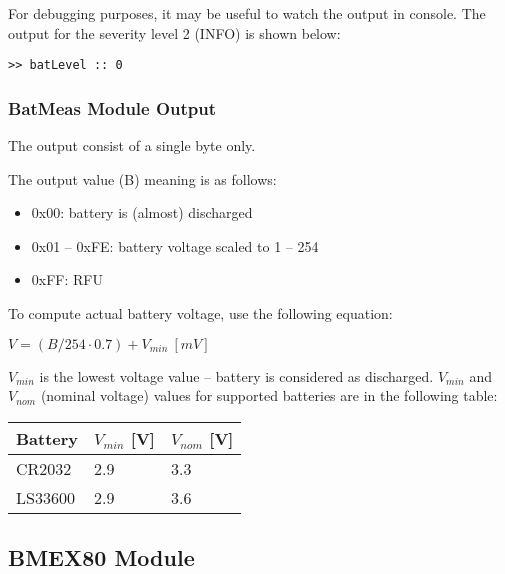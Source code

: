 For debugging purposes, it may be useful to watch the  output in console. The output for the severity level 2 (INFO) is shown below:

\begin{docCodeExample}
\begin{verbatim}
>> batLevel :: 0
\end{verbatim}
\end{docCodeExample}

\subsubsection{BatMeas Module Output}
  The  output consist of a single byte only.
  
  The  output value (B) meaning is as follows:
  
  \begin{itemize}
    \item 0x00: battery is (almost) discharged
    \item 0x01 -- 0xFE: battery voltage scaled to 1 -- 254
    \item 0xFF: RFU
  \end{itemize}
  
  To compute actual battery voltage, use the following equation:
  
  $V = (B/254 \cdot 0.7) + V_{min} ~[mV]$
  
  $V_{min}$ is the lowest voltage value -- battery is considered as discharged. $V_{min}$ and $V_{nom}$ (nominal voltage) values for supported batteries are in the following table:
  
  \begin{table*}[!ht]
    \begin{tabular}{| p{3.5cm} | p{2cm} | p{2cm} |}
        \hline
        \rowcolor{SeaGreen3!30!} {\bf Battery} & $V_{min}$ [V] & $V_{nom}$ [V] \\
        \hline
        \hline
        CR2032 & 2.9 & 3.3 \\
        \hline
        LS33600 & 2.9 & 3.6 \\
        \hline
    \end{tabular}
    \label{tab:spec:AMR}
   \end{table*}
  

\clearpage
\subsection{BMEX80 Module}

